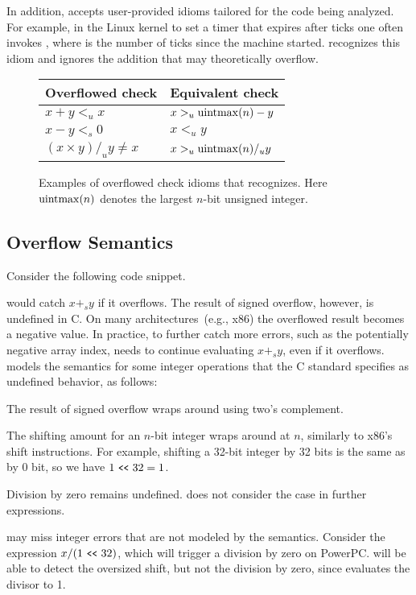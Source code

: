 In addition, \sys accepts user-provided idioms tailored for the
code being analyzed.  For example, in the Linux kernel to set a
timer that expires after  ticks one often invokes
, where  is the
number of ticks since the machine started.  \sys recognizes
this idiom and ignores the addition  that may
theoretically overflow.
\fi

\begin{figure}
\centering
\begin{tabular}{ll}
\toprule
Overflowed check & Equivalent check \\ \midrule
$x + y <_u x$ & $x >_u \operatorname{uintmax}(n) - y$ \\
$x - y <_s 0$ & $x <_u y$ \\
$(x \times y) /_u y \neq x$ & $x >_u \operatorname{uintmax}(n) /_u y$   \\
\bottomrule
\end{tabular}
\caption{Examples of overflowed check idioms that \sys recognizes.
Here $\operatorname{uintmax}(n)$ denotes the largest $n$-bit unsigned integer.}
\label{f:whitelist}
\end{figure}

\subsection{Overflow Semantics}
\label{s:sema:def}

Consider the following code snippet.

\sys would catch $x +_s y$ if it overflows. The result of signed overflow,
however, is undefined in C\@. On many architectures~(e.g., x86) the overflowed
result becomes a negative value. In practice, to further catch more errors,
such as the potentially negative array index, \sys needs to continue evaluating
$x +_s y$, even if it overflows.  \sys models the semantics for some integer
operations that the C standard specifies as undefined behavior, as follows:

\begin{CompactItemize}
\item
The result of signed overflow wraps around using two's complement.
\item
The shifting amount for an $n$-bit integer wraps around at $n$,
similarly to x86's shift instructions.  For example, shifting
a 32-bit integer by 32 bits is the same as by $0$ bit,
so we have $1 \shl 32 = 1$.
\end{CompactItemize}
Division by zero remains undefined.  \sys does not consider the case
in further expressions.

\sys may miss integer errors that are not modeled by the semantics.
Consider the expression $x / (1 \shl 32)$, which will trigger a
division by zero on PowerPC\@.  \sys will be able to detect the
oversized shift, but not the division by zero, since \sys evaluates
the divisor to 1.


